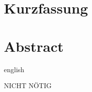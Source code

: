 \thispagestyle{plain}



\section*{Kurzfassung}

\section*{Abstract} 
\begin{foreignlanguage}{english}

\end{foreignlanguage} 

NICHT NÖTIG
